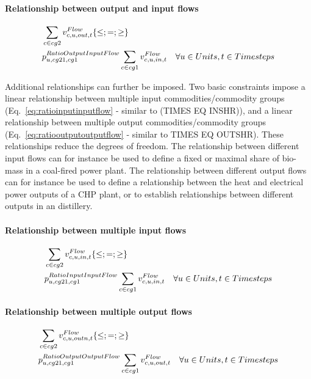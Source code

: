 \paragraph{Relationship between output and input flows}
\begin{align} \label{eq:ratiooutputinputflow}
&\sum_{\commodity \in cg2} \vFlow[\commodity,\unit,out,\timestep] \{\le;=;\ge\} \nonumber \\
&\pRatioOutputInputFlow \sum_{\commodity \in cg1} \vFlow[\commodity,\unit,in,\timestep] \quad \forall \units, \timesteps
\end{align}

Additional relationships can further be imposed. Two basic constraints impose a linear relationship between multiple input commodities/commodity groups (Eq.~\eqref{eq:ratioinputinputflow} - similar to (TIMES EQ INSHR)), and a linear relationship between multiple output commodities/commodity groups (Eq.~\eqref{eq:ratiooutputoutputflow} - similar to TIMES EQ OUTSHR). These relationships reduce the degrees of freedom. The relationship between different input flows can for instance be used to define a fixed or maximal share of bio-mass in a coal-fired power plant. The relationship between different output flows can for instance be used to define a relationship between the heat and electrical power outputs of a CHP plant, or to establish relationships between different outputs in an distillery. 

\paragraph{Relationship between multiple input flows}
\begin{align} \label{eq:ratioinputinputflow}
&\sum_{\commodity \in cg2} \vFlow[\commodity,\unit,in,\timestep] \{\le;=;\ge\} \nonumber \\
&\pRatioInputInputFlow \sum_{\commodity \in cg1} \vFlow[\commodity,\unit,in,\timestep] \quad \forall \units, \timesteps
\end{align}

\paragraph{Relationship between multiple output flows}
\begin{align} \label{eq:ratiooutputoutputflow}
&\sum_{\commodity \in cg2} \vFlow[\commodity,\unit,outn,\timestep] \{\le;=;\ge\} \nonumber \\
&\pRatioOutputOutputFlow \sum_{\commodity \in cg1} \vFlow[\commodity,\unit,out,\timestep] \quad \forall \units, \timesteps
\end{align}


